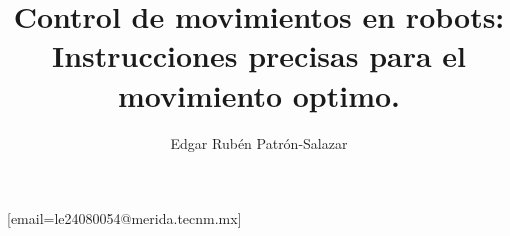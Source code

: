 \documentclass[hf]{ceurart}
\begin{document}


%

\title{Control de movimientos en robots: Instrucciones precisas para el movimiento optimo.}


\author[1]{Edgar Rubén Patrón-Salazar}[email=le24080054@merida.tecnm.mx]

\cormark[1]

\address[1]{Tecnológico Nacional de México/IT de Mérida,
  Department of Systems and Computing, Merida, Mexico}
%
\maketitle
%
\end{document}
